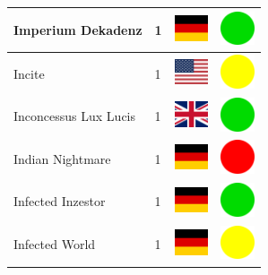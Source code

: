 \documentclass[12pt, a4paper, twoside]{report}
\begin{document}
\begin{center}
\begin{longtable}{|p{5cm}|p{2cm}|p{2cm}|p{2cm}|}
			Imperium Dekadenz & 1 & \includegraphics[width=1cm]{4x3/de} & \includegraphics[width=1cm]{likes/y} \\ \hline
			Incite & 1 & \includegraphics[width=1cm]{4x3/us} & \includegraphics[width=1cm]{likes/m} \\ \hline
			Inconcessus Lux Lucis & 1 & \includegraphics[width=1cm]{4x3/gb} & \includegraphics[width=1cm]{likes/y} \\ \hline
			Indian Nightmare & 1 & \includegraphics[width=1cm]{4x3/de} & \includegraphics[width=1cm]{likes/n} \\ \hline
			Infected Inzestor & 1 & \includegraphics[width=1cm]{4x3/de} & \includegraphics[width=1cm]{likes/y} \\ \hline
			Infected World & 1 & \includegraphics[width=1cm]{4x3/de} & \includegraphics[width=1cm]{likes/m} \\ \hline

\end{longtable}
\end{center}
\end{document}
